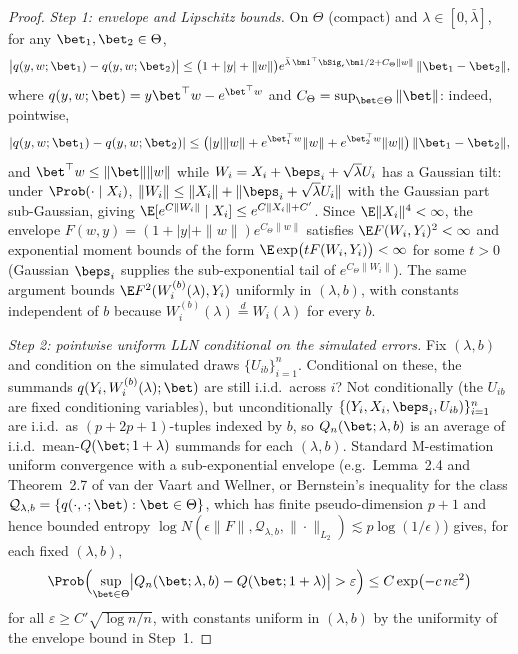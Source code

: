 \begin{proof}
\emph{Step 1: envelope and Lipschitz bounds.} On $\Theta$ (compact) and
$\lambda\in[0,\bar\lambda]$, for any $\bet_1,\bet_2\in\Theta$,
\[
  \bigl|q(y,w;\bet_1)-q(y,w;\bet_2)\bigr|
  \le \bigl(1+|y|+\|w\|\bigr)e^{\bar\lambda\,\bm 1^\top\bSig_\epsilon\bm 1/2
        + C_{\Theta}\|w\|}\,\|\bet_1-\bet_2\|,
\]
where $q(y,w;\bet)=y\bet^\top w-e^{\bet^\top w}$ and $C_\Theta=
\sup_{\bet\in\Theta}\|\bet\|$: indeed, pointwise,
\[
  |q(y,w;\bet_1)-q(y,w;\bet_2)|\le \bigl(|y|\|w\|
  + e^{\bet_1^\top w}\|w\| + e^{\bet_2^\top w}\|w\|\bigr)\,
  \|\bet_1-\bet_2\|,
\]
and
$\bet^\top w\le\|\bet\|\|w\|$ while
$W_i=X_i+\beps_i+\sqrt\lambda U_i$ has a Gaussian tilt: under
$\Prob(\cdot\mid X_i)$, $\|W_i\|\le\|X_i\|+\|\beps_i+\sqrt\lambda U_i\|$
with the Gaussian part sub-Gaussian, giving
$\E[e^{C\|W_i\|}\mid X_i]\le e^{C\|X_i\|+C'}$. Since $\E\|X_i\|^4<\infty$,
the envelope $F(w,y)=(1+|y|+\|w\|)e^{C_{\Theta}\|w\|}$ satisfies
$\E F(W_i,Y_i)^2<\infty$ and exponential moment bounds of the
form
$\E\exp\bigl(tF(W_i,Y_i)\bigr)<\infty$ for some $t>0$ (Gaussian
$\beps_i$ supplies the sub-exponential tail of $e^{C_\Theta\|W_i\|}$).
The same argument bounds $\E F^2(W_i^{(b)}(\lambda),Y_i)$ uniformly in
$(\lambda,b)$, with constants independent of $b$ because
$W_i^{(b)}(\lambda)\stackrel{d}{=}W_i(\lambda)$ for every $b$.

\emph{Step 2: pointwise uniform LLN conditional on the simulated errors.}
Fix $(\lambda,b)$ and condition on the simulated draws
$\{U_{ib}\}_{i=1}^n$. Conditional on these, the summands
$q(Y_i,W_i^{(b)}(\lambda);\bet)$ are still i.i.d.\ across $i$? Not
conditionally (the $U_{ib}$ are fixed conditioning variables), but
unconditionally
$\{(Y_i,X_i,\beps_i,U_{ib})\}_{i=1}^n$ are i.i.d.\ as $(p+2p+1)$-tuples
indexed by $b$, so $Q_n(\bet;\lambda,b)$ is an average of i.i.d.\
mean-$Q(\bet;1+\lambda)$ summands for each $(\lambda,b)$. Standard
M-estimation uniform convergence with a sub-exponential envelope
(e.g.\ Lemma~2.4 and Theorem~2.7 of van der Vaart and Wellner, or
Bernstein's inequality for the class
$\mathcal Q_{\lambda,b}=\{q(\cdot,\cdot;\bet):\bet\in\Theta\}$, which has
finite pseudo-dimension $p+1$ and hence bounded entropy
$\log N(\epsilon\|F\|,\mathcal Q_{\lambda,b},\|\cdot\|_{L_2})
\lesssim p\log(1/\epsilon)$) gives, for each fixed $(\lambda,b)$,
\[
  \Prob\Bigl(\sup_{\bet\in\Theta}
  \bigl|Q_n(\bet;\lambda,b)-Q(\bet;1+\lambda)\bigr|>\varepsilon\Bigr)
  \le C\exp\bigl(-c\,n\varepsilon^2\bigr)
\]
for all $\varepsilon\ge C'\sqrt{\log n/n}$, with constants uniform in
$(\lambda,b)$ by the uniformity of the envelope bound in Step~1.


\end{proof}
